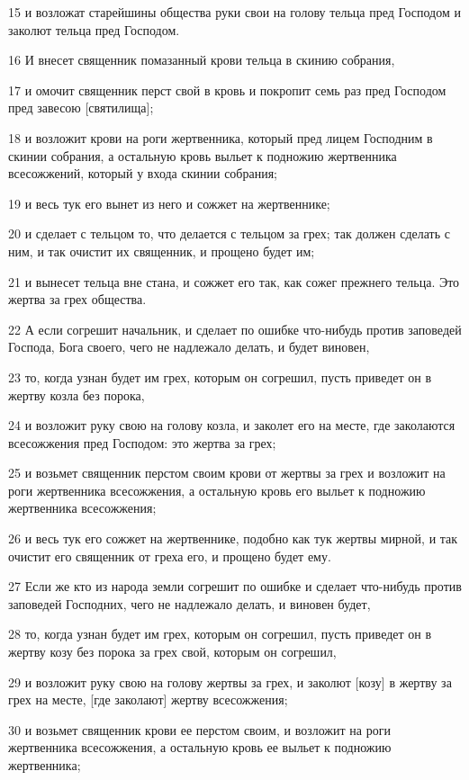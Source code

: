 \par 15 и возложат старейшины общества руки свои на голову тельца пред Господом и заколют тельца пред Господом.
\par 16 И внесет священник помазанный крови тельца в скинию собрания,
\par 17 и омочит священник перст свой в кровь и покропит семь раз пред Господом пред завесою [святилища];
\par 18 и возложит крови на роги жертвенника, который пред лицем Господним в скинии собрания, а остальную кровь выльет к подножию жертвенника всесожжений, который у входа скинии собрания;
\par 19 и весь тук его вынет из него и сожжет на жертвеннике;
\par 20 и сделает с тельцом то, что делается с тельцом за грех; так должен сделать с ним, и так очистит их священник, и прощено будет им;
\par 21 и вынесет тельца вне стана, и сожжет его так, как сожег прежнего тельца. Это жертва за грех общества.
\par 22 А если согрешит начальник, и сделает по ошибке что-нибудь против заповедей Господа, Бога своего, чего не надлежало делать, и будет виновен,
\par 23 то, когда узнан будет им грех, которым он согрешил, пусть приведет он в жертву козла без порока,
\par 24 и возложит руку свою на голову козла, и заколет его на месте, где заколаются всесожжения пред Господом: это жертва за грех;
\par 25 и возьмет священник перстом своим крови от жертвы за грех и возложит на роги жертвенника всесожжения, а остальную кровь его выльет к подножию жертвенника всесожжения;
\par 26 и весь тук его сожжет на жертвеннике, подобно как тук жертвы мирной, и так очистит его священник от греха его, и прощено будет ему.
\par 27 Если же кто из народа земли согрешит по ошибке и сделает что-нибудь против заповедей Господних, чего не надлежало делать, и виновен будет,
\par 28 то, когда узнан будет им грех, которым он согрешил, пусть приведет он в жертву козу без порока за грех свой, которым он согрешил,
\par 29 и возложит руку свою на голову жертвы за грех, и заколют [козу] в жертву за грех на месте, [где заколают] жертву всесожжения;
\par 30 и возьмет священник крови ее перстом своим, и возложит на роги жертвенника всесожжения, а остальную кровь ее выльет к подножию жертвенника;
